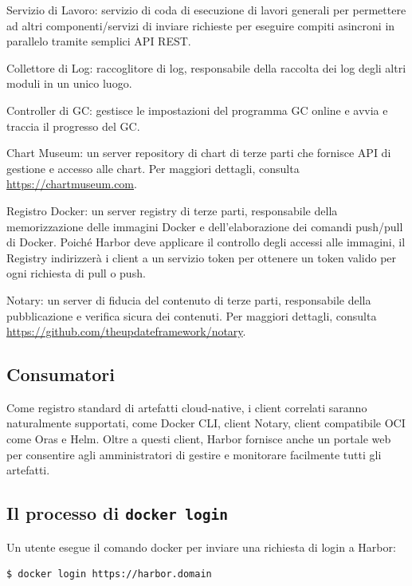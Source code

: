 \documentclass[12pt]{report}
\begin{document}
Servizio di Lavoro: servizio di coda di esecuzione di lavori generali per permettere ad altri componenti/servizi di inviare richieste per eseguire compiti asincroni in parallelo tramite semplici API REST.

Collettore di Log: raccoglitore di log, responsabile della raccolta dei log degli altri moduli in un unico luogo.

Controller di GC: gestisce le impostazioni del programma GC online e avvia e traccia il progresso del GC.

Chart Museum: un server repository di chart di terze parti che fornisce API di gestione e accesso alle chart. Per maggiori dettagli, consulta \url{https://chartmuseum.com}.

Registro Docker: un server registry di terze parti, responsabile della memorizzazione delle immagini Docker e dell'elaborazione dei comandi push/pull di Docker. Poiché Harbor deve applicare il controllo degli accessi alle immagini, il Registry indirizzerà i client a un servizio token per ottenere un token valido per ogni richiesta di pull o push.

Notary: un server di fiducia del contenuto di terze parti, responsabile della pubblicazione e verifica sicura dei contenuti. Per maggiori dettagli, consulta \url{https://github.com/theupdateframework/notary}.

\subsection{Consumatori}
Come registro standard di artefatti cloud-native, i client correlati saranno naturalmente supportati, come Docker CLI, client Notary, client compatibile OCI come Oras e Helm. Oltre a questi client, Harbor fornisce anche un portale web per consentire agli amministratori di gestire e monitorare facilmente tutti gli artefatti.

\subsection{Il processo di \texttt{docker login}}
Un utente esegue il comando docker per inviare una richiesta di login a Harbor:
\begin{verbatim}
$ docker login https://harbor.domain
\end{verbatim}
\end{document}
